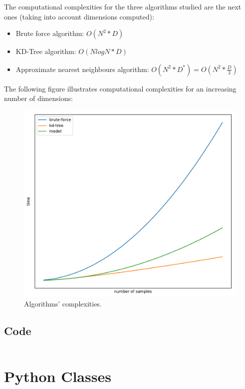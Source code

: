 \documentclass[a4paper,11pt,spanish]{report}
\begin{document}
The computational complexities for the three algorithms studied are the next ones (taking into account dimensions computed):

\begin{itemize}
\item Brute force algorithm: $ O(N^{2} * D)$ 
\item KD-Tree algorithm: $ O(NlogN * D)$ 
\item Approximate nearest neighbours algorithm: $ O(N^{2}*D^{*}) = O(N^{2}*\frac{D}{3})$ 
\end{itemize}

The following figure illustrates computational complexities for an increasing number of dimensions:

\begin{figure}[h]
\centering
\includegraphics[width=12cm]{figures/complexities.pdf}
\caption{\label{figurecomplexities}Algorithms' complexities.}
\end{figure}

\subsection{Code}
\label{ssec:code2}

\vspace{10px}

\inputminted[baselinestretch=1, fontsize=\scriptsize, breaklines]{python}{application2.py}

\section{Python Classes}
\label{sec:classes}
\end{document}
